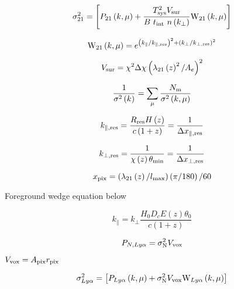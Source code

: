 \lipsum[1-1]

\begin{equation}
\sigma_{21}^2 = \left[ P_{21}\left(k, \mu \right) + \frac{T^2_{\rm sys} V_{\rm sur}}{B \ t_{\rm int} \ n \left(k_{\perp}\right)} {\rm W}_{21}\left(k, \mu \right) \right]
\end{equation}

\lipsum[2-4]

\begin{equation}
{\rm W}_{21}\left(k, \mu \right) = e^{\left(k_{\parallel} / k_{\parallel, \rm res} \right)^2 + \left(k_{\perp} / k_{\perp, \rm res} \right)^2}
\end{equation}

\begin{equation}
V_{\rm sur} = \chi^2 \Delta \chi \left( \lambda_{21} \left( z \right)^2 / A_e\right)^2
\end{equation}

\lipsum[2-4]

\begin{equation}
\frac{1}{\sigma^2 \left( k \right)} = \sum_{\mu} \frac{N_{\rm m}}{\sigma^2 \left( k, \mu \right)}
\end{equation}

\begin{equation}
k_{\parallel, \rm res} = \frac{R_{\rm res} H \left( z\right)}{c \left(1 + z\right)} = \frac{1}{\Delta x_{\parallel, \rm res}}
\end{equation}

\lipsum[2-4]

\begin{equation}
k_{\perp, \rm res} = \frac{1}{\chi \left( z \right) \theta_{\rm min}} = \frac{1}{\Delta x_{\perp, \rm res}}
\end{equation}

\lipsum[2-4]

\begin{equation}
x_{\rm pix} = \left( \lambda_{21} \left( z \right) / l_{\rm max}\right) \left( \pi / 180 \right) / 60
\end{equation}

Foreground wedge equation below

\begin{equation}
k_{\parallel} = k_{\perp} \frac{H_0 D_c E \left( z \right) \theta_0}{c \left( 1 + z \right)}
\end{equation}

\begin{equation}
P_{N, Ly\alpha} = \sigma_{\rm N}^2 V_{\rm vox}
\end{equation}

$V_{\rm vox} = A_{\rm pix} r_{\rm pix}$

\begin{equation}
\sigma_{Ly\alpha}^2 = \left[ P_{Ly\alpha}\left(k, \mu \right) + \sigma_{\rm N}^2 V_{\rm vox} {\rm W}_{Ly\alpha}\left(k, \mu \right) \right]
\end{equation}
